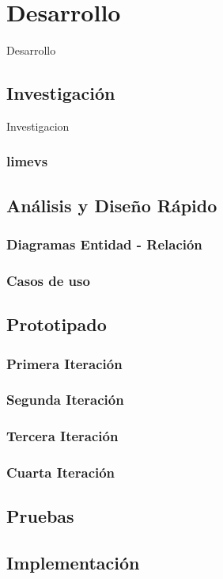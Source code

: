 \chapter{Desarrollo}
Desarrollo
\section{Investigación}
Investigacion
\subsection{limevs}
\section{Análisis y Diseño Rápido}
\subsection{Diagramas Entidad - Relación}
\subsection{Casos de uso}
\section{Prototipado}
\subsection{Primera Iteración}
\subsection{Segunda Iteración}
\subsection{Tercera Iteración}
\subsection{Cuarta Iteración}
\section{Pruebas}
\section{Implementación}